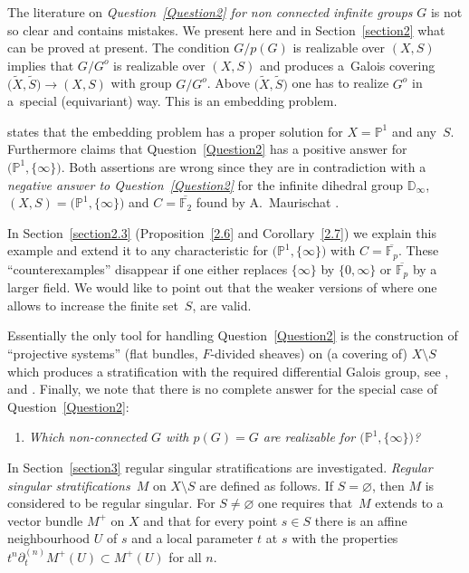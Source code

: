 \documentclass[10pt,a4paper]{amsart}
\numberwithin{equation}{section}
\begin{document}
The literature on {\it Question~{\rm \ref{Question2}} for non connected infinite groups} $G$ is not so clear and contains mistakes. We present here and in Section~\ref{section2} what can be proved at present. The condition $G/p(G)$ is realizable over $(X,S)$ implies that $G/G^o$ is realizable over $(X,S)$ and produces a~Galois covering $\big(\tilde{X},\tilde{S}\big)\rightarrow (X,S)$ with group $G/G^o$. Above $\big(\tilde{X},\tilde{S}\big)$ one has to realize $G^o$ in a~special (equivariant) way. This is an embedding problem.

\cite[Proposition 8.7]{Ma-vdP2} states that the embedding problem has a proper solution for $X=\mathbb{P}^1$ and any~$S$. Furthermore \cite[Theorem~8.11]{Ma-vdP2} claims that Question~\ref{Question2} has a positive answer for~$\big(\mathbb{P}^1,\{\infty \}\big)$. Both assertions are wrong since they are in contradiction with a {\it negative answer to Question~{\rm \ref{Question2}}} for the infinite dihedral group $\mathbb{D}_\infty$, $(X,S)=\big(\mathbb{P}^1, \{\infty \}\big)$ and $C=\overline{\mathbb{F}_2}$ found by A.~Maurischat \cite[Theorem~9.1]{R}.

In Section~\ref{section2.3} (Proposition~\ref{2.6} and Corollary~\ref{2.7}) we explain this example and extend it to any characteristic for $\big(\mathbb{P}^1,\{\infty \}\big)$
with $C=\overline{\mathbb{F}_p}$. These ``counterexamples'' disappear if one either replaces $\{\infty \}$ by $\{0,\infty \}$ or $\overline{\mathbb{F}_p}$ by a larger field. We would like to point out that the weaker versions of \cite[Proposition~8.7, Theorems~8.8 and~8.11]{Ma-vdP2} where one allows to increase the finite set~$S$, are valid.

Essentially the only tool for handling Question~\ref{Question2} is the construction of ``projective systems'' (flat bundles, $F$-divided sheaves) on (a covering of) $X\setminus S$ which produces a stratification with the required differential Galois group, see \cite[Theorem~1.3]{Gie}, \cite[Proposition~5.1]{Ma-vdP1} and \cite[Theorem~8]{Sa}. Finally, we note that there is no complete answer for the special case of Question~\ref{Question2}:
\begin{enumerate}\itemsep=0pt
\item[]{\it Which non-connected $G$ with $p(G)=G$ are realizable for $\big(\mathbb{P}^1,\{\infty \}\big)$?}
\end{enumerate}

In Section~\ref{section3} regular singular stratifications are investigated. {\it Regular singular stratifications}~$M$ on $X\setminus S$ are defined as follows. If $S=\varnothing$, then $M$ is considered to be regular singular. For $S\neq \varnothing$ one requires that~$M$ extends to a vector bundle $M^+$ on $X$ and that for every point $s\in S$ there is an affine neighbourhood $U$ of $s$ and a local parameter $t$ at $s$ with the properties $t^n\partial _t^{(n)}M^+(U)\subset M^+(U)$ for all $n$.
\end{document}
